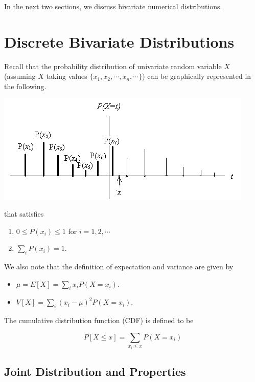 \documentclass[
]{book}
\begin{document}
In the next two sections, we discuss bivariate numerical distributions.

\hfill\break

\hypertarget{discrete-bivariate-distributions}{%
\section{Discrete Bivariate Distributions}\label{discrete-bivariate-distributions}}

Recall that the probability distribution of univariate random variable \(X\) (assuming \(X\) taking values \(\{x_1, x_2, \cdots, x_n, \cdots \}\)) can be graphically represented in the following.

\begin{center}\includegraphics[width=0.6\linewidth]{topic06/univariateDiscreteDist} \end{center}

that satisfies

\begin{enumerate}
\def\labelenumi{\arabic{enumi}.}
\item
  \(0 \le P(x_i) \le 1\) for \(i=1, 2, \cdots\)
\item
  \(\sum_i P(x_i) = 1\).
\end{enumerate}

We also note that the definition of expectation and variance are given by

\begin{itemize}
\item
  \(\mu = E[X] = \sum_i x_iP(X = x_i)\).
\item
  \(V[X] = \sum_i (x_i - \mu)^2P(X=x_i)\).
\end{itemize}

The cumulative distribution function (CDF) is defined to be

\[
P[X \le x] = \sum_{x_i \le x} P(X = x_i)
\]

\hypertarget{joint-distribution-and-properties}{%
\subsection{Joint Distribution and Properties}\label{joint-distribution-and-properties}}
\end{document}

